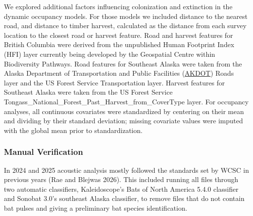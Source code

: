 \documentclass[
  letterpaper,
  DIV=11,
  numbers=noendperiod]{scrartcl}
\begin{document}
We explored additional factors influencing colonization and extinction
in the dynamic occupancy models. For those models we included distance
to the nearest road, and distance to timber harvest, calculated as the
distance from each survey location to the closest road or harvest
feature. Road and harvest features for British Columbia were derived
from the unpublished Human Footprint Index (HFI) layer currently being
developed by the Geospatial Centre within Biodiversity Pathways. Road
features for Southeast Alaska were taken from the Alaska Department of
Transportation and Public Facilities
(\href{Model\%20covariates\%20for\%20the\%20activity\%20trend\%20models\%20and\%20dynamic\%20occupancy\%20models\%20were\%20based\%20on\%20those\%20established\%20by\%20@rae2024,\%20with\%20additional\%20exploration\%20of\%20factors\%20influencing\%20colonization\%20and\%20extinction\%20in\%20the\%20dynamic\%20occupancy\%20models.\%20For\%20the\%20dynamic\%20occupancy\%20models\%20we\%20included\%20distance\%20to\%20the\%20nearest\%20road,\%20calculated\%20as\%20the\%20distance\%20from\%20each\%20survey\%20location\%20to\%20the\%20closest\%20road\%20feature.\%20Road\%20features\%20for\%20British\%20Columbia\%20were\%20derived\%20from\%20the\%20unpublished\%20Human\%20Footprint\%20Index\%20(HFI)\%20layer\%20currently\%20being\%20developed\%20by\%20the\%20Geospatial\%20Centre\%20within\%20Biodiversity\%20Pathways,\%20while\%20those\%20for\%20Southeast\%20Alaska\%20were\%20taken\%20from\%20the\%20Alaska\%20Department\%20of\%20Transportation\%20and\%20Public\%20Facilities\%20(AKDOT)\%20Roads\%20layer,\%20a\%20statewide\%20road-centerline\%20dataset\%20distributed\%20through\%20the\%20State\%20of\%20Alaska\%20open-data\%20portal\%20(https://gis.data.alaska.gov/datasets/AKDOT::roads-akdot/about).}{AKDOT})
Roads layer and the US Forest Service Transportation layer. Harvest
features for Southeast Alaska were taken from the US Forest Service
Tongass\_National\_Forest\_Past\_Harvest\_from\_CoverType layer. For
occupancy analyses, all continuous covariates were standardized by
centering on their mean and dividing by their standard deviation;
missing covariate values were imputed with the global mean prior to
standardization.

\subsubsection{Manual Verification}\label{manual-verification}

In 2024 and 2025 acoustic analysis mostly followed the standards set by
WCSC in previous years (Rae and Blejwas 2026). This included running all
files through two automatic classifiers, Kaleidoscope's Bats of North
America 5.4.0 classifier and Sonobat 3.0's southeast Alaska classifier,
to remove files that do not contain bat pulses and giving a preliminary
bat species identification.
\end{document}
